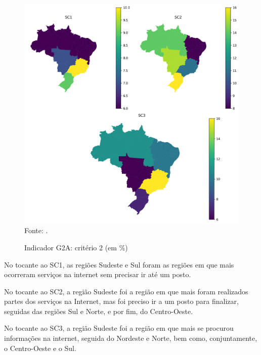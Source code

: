 \begin{figure}[H]
	\centering
	\caption{Indicador G2A: critério 2 (em \%)}
	\includegraphics[width=1\linewidth]{figuras/mapa_coropletico_tic_domicilios_2024_g2a_2.png}
	\label{fig:mapa_coropletico_tic_domicilios_2024_g2a_2}
	\footnotesize{Fonte: \cite{tic_domicilios_2024_g2a}.}
\end{figure}

No tocante ao SC1, as regiões Sudeste e Sul foram as regiões em que mais ocorreram serviços na internet sem precisar ir até um posto.

No tocante ao SC2, a região Sudeste foi a região em que mais foram realizados partes dos serviços na Internet, mas foi preciso ir a um posto para finalizar, seguidas  das regiões Sul e Norte, e por fim, do Centro-Oeste.

No tocante ao SC3, a região Sudeste foi a região em que mais se procurou informações na internet, seguida do Nordeste e Norte, bem como, conjuntamente, o Centro-Oeste e o Sul.

